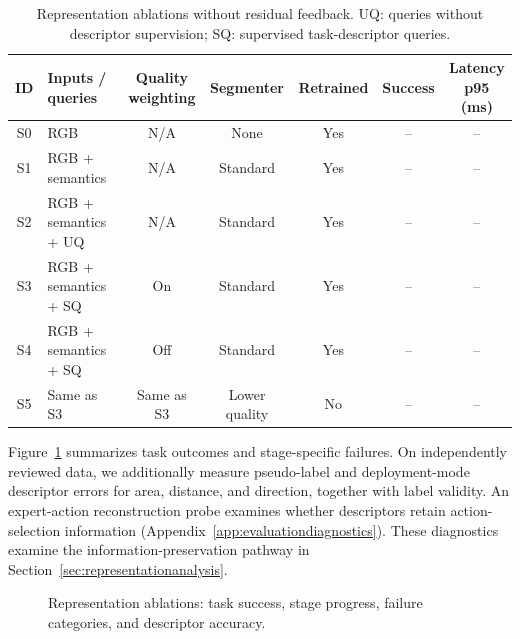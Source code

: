 \begin{table}[!t]
\caption{Representation ablations without residual feedback. UQ: queries without descriptor supervision; SQ: supervised task-descriptor queries.}
\label{tab:representationablation}
\centering\small
\setlength{\tabcolsep}{5pt}
\begin{tabular}{clccccc}
\toprule
ID & Inputs / queries & \shortstack{Quality\\weighting} & Segmenter & Retrained & Success & \shortstack{Latency\\p95 (ms)}\\
\midrule
S0 & RGB & N/A & None & Yes & -- & --\\
S1 & RGB + semantics & N/A & Standard & Yes & -- & --\\
S2 & RGB + semantics + UQ & N/A & Standard & Yes & -- & --\\
S3 & RGB + semantics + SQ & On & Standard & Yes & -- & --\\
S4 & RGB + semantics + SQ & Off & Standard & Yes & -- & --\\
S5 & Same as S3 & Same as S3 & Lower quality & No & -- & --\\
\bottomrule
\end{tabular}
\end{table}
Figure~\ref{fig:representationdiagnostics} summarizes task outcomes and stage-specific failures.
On independently reviewed data, we additionally measure pseudo-label and deployment-mode descriptor errors for area, distance, and direction, together with label validity.
An expert-action reconstruction probe examines whether descriptors retain action-selection information (Appendix~\ref{app:evaluationdiagnostics}).
These diagnostics examine the information-preservation pathway in Section~\ref{sec:representationanalysis}.

\begin{figure}[!t]
\centering
\caption{Representation ablations: task success, stage progress, failure categories, and descriptor accuracy.}
\label{fig:representationdiagnostics}
\end{figure}

